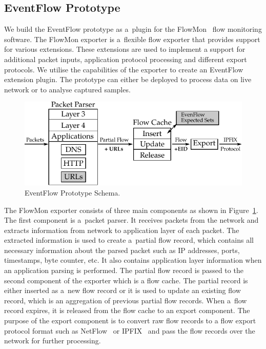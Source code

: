 \subsection{EventFlow Prototype} \label{subsec:eventflow-prototype}

We build the EventFlow prototype as a~plugin for the FlowMon~\cite{FlowmonNetworks--Flowmon} flow monitoring software. The FlowMon exporter is a~flexible flow exporter that provides support for various extensions. These extensions are used to implement a support for additional packet inputs, application protocol processing and different export protocols. We utilise the capabilities of the exporter to create an EventFlow extension plugin. The prototype can either be deployed to process data on live network or to analyse captured samples.

\begin{figure}[!tb]
    \centering 
    \includegraphics{figures/paper-eventflow/prototype-schema}
    \caption{EventFlow Prototype Schema.}
    \label{fig:eventflow-prototype-schema}
\end{figure}


The FlowMon exporter consists of three main components as shown in Figure~\ref{fig:eventflow-prototype-schema}. The first component is a~packet parser. It receives packets from the network and extracts information from network to application layer of each packet. The extracted information is used to create a~partial flow record, which contains all necessary information about the parsed packet such as IP addresses, ports, timestamps, byte counter, etc. It also contains application layer information when an application parsing is performed. The partial flow record is passed to the second component of the exporter which is a flow cache. The partial record is either inserted as a~new flow record or it is used to update an existing flow record, which is an aggregation of previous partial flow records. When a~flow record expires, it is released from the flow cache to an export component. The purpose of the export component is to convert raw flow records to a flow export protocol format such as NetFlow~\cite{rfc3954} or IPFIX~\cite{rfc7011} and pass the flow records over the network for further processing.

